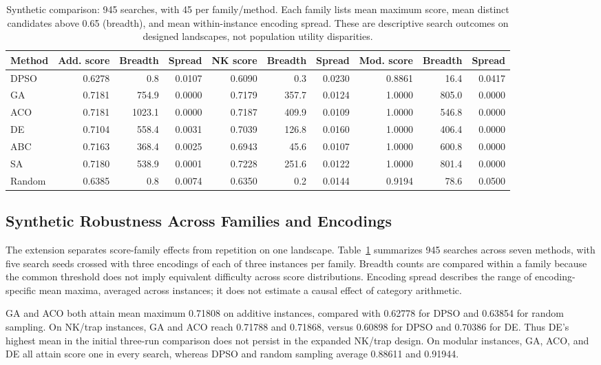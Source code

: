 \documentclass[sigconf,nonacm]{acmart}
\begin{document}
\begin{table}[t]
\centering
\caption{Synthetic comparison: 945 searches, with 45 per family/method. Each family lists mean maximum score, mean distinct candidates above 0.65 (breadth), and mean within-instance encoding spread. These are descriptive search outcomes on designed landscapes, not population utility disparities.}
\label{tab:synthetic-robustness}
\small
\begin{tabular}{lrrrrrrrrr}
\toprule
Method & Add. score & Breadth & Spread & NK score & Breadth & Spread & Mod. score & Breadth & Spread \\
\midrule
DPSO & 0.6278 & 0.8 & 0.0107 & 0.6090 & 0.3 & 0.0230 & 0.8861 & 16.4 & 0.0417 \\
GA & 0.7181 & 754.9 & 0.0000 & 0.7179 & 357.7 & 0.0124 & 1.0000 & 805.0 & 0.0000 \\
ACO & 0.7181 & 1023.1 & 0.0000 & 0.7187 & 409.9 & 0.0109 & 1.0000 & 546.8 & 0.0000 \\
DE & 0.7104 & 558.4 & 0.0031 & 0.7039 & 126.8 & 0.0160 & 1.0000 & 406.4 & 0.0000 \\
ABC & 0.7163 & 368.4 & 0.0025 & 0.6943 & 45.6 & 0.0107 & 1.0000 & 600.8 & 0.0000 \\
SA & 0.7180 & 538.9 & 0.0001 & 0.7228 & 251.6 & 0.0122 & 1.0000 & 801.4 & 0.0000 \\
Random & 0.6385 & 0.8 & 0.0074 & 0.6350 & 0.2 & 0.0144 & 0.9194 & 78.6 & 0.0500 \\
\bottomrule
\end{tabular}
\end{table}


\subsection{Synthetic Robustness Across Families and Encodings}
The extension separates score-family effects from repetition on one landscape. Table~\ref{tab:synthetic-robustness} summarizes 945 searches across seven methods, with five search seeds crossed with three encodings of each of three instances per family. Breadth counts are compared within a family because the common threshold does not imply equivalent difficulty across score distributions. Encoding spread describes the range of encoding-specific mean maxima, averaged across instances; it does not estimate a causal effect of category arithmetic.

GA and ACO both attain mean maximum 0.71808 on additive instances, compared with 0.62778 for DPSO and 0.63854 for random sampling. On NK/trap instances, GA and ACO reach 0.71788 and 0.71868, versus 0.60898 for DPSO and 0.70386 for DE. Thus DE's highest mean in the initial three-run comparison does not persist in the expanded NK/trap design. On modular instances, GA, ACO, and DE all attain score one in every search, whereas DPSO and random sampling average 0.88611 and 0.91944.
\end{document}
